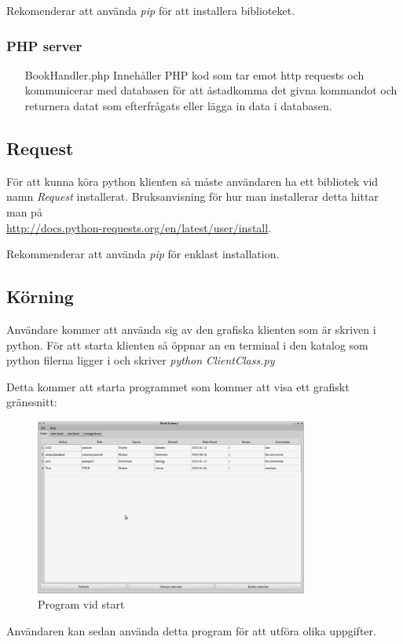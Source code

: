 \documentclass[11pt, titlepage, oneside, a4paper]{article}
\newcommand{\Subsection}[1]{\vspace{-4pt}\subsection{#1}\vspace{-8pt}}
\newcommand{\Subsubsection}[1]{\vspace{-4pt}\subsubsection{#1}\vspace{-8pt}}
\begin{document}
           
        	Rekomenderar att använda \emph{pip} för att installera biblioteket.
            \Subsubsection{PHP server}
            \begin{itemize}
			\item[BookHandler.php] Innehåller PHP kod som tar emot http requests och kommunicerar med databasen för att åstadkomma det givna kommandot och returnera datat som efterfrågats eller lägga in data i databasen.
            
			\end{itemize}
            
        \Subsection{Request}
           För att kunna köra python klienten så måste användaren ha ett bibliotek vid namn \emph{Request} installerat. 
           Bruksanvisning för hur man installerar detta hittar man på \\           \url{http://docs.python-requests.org/en/latest/user/install}.
           
         Rekommenderar att använda \emph{pip} för enklast installation.
         
        \newpage    
        \Subsection{Körning}
        Användare kommer att använda sig av den grafiska klienten som är skriven i python. För att starta
        klienten så öppnar an en terminal i den katalog som python filerna ligger i och skriver \emph{python ClientClass.py}
        
        Detta kommer att starta programmet som kommer att visa ett grafiskt gränssnitt:
        \begin{figure}[h!]
        \includegraphics[width=0.8\textwidth]{startscreen}
        \caption{Program vid start}
        \label{fig:start}
        \end{figure}
        
        Användaren kan sedan använda detta program för att utföra olika uppgifter.
        
\end{document}
